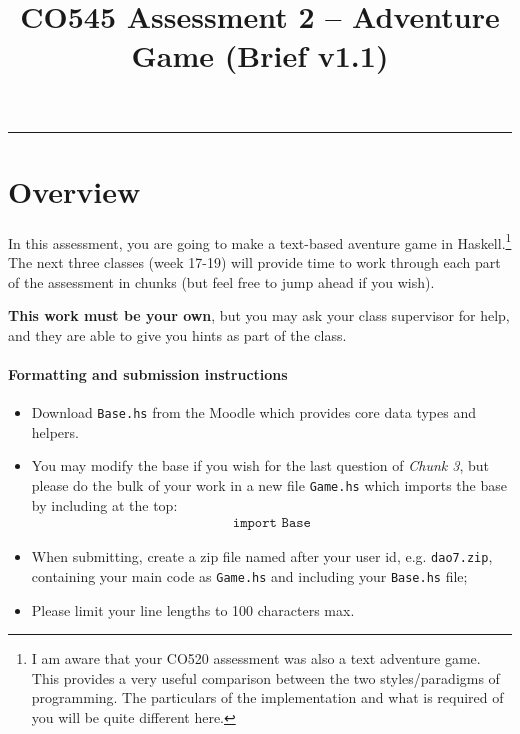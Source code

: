 \documentclass{article}
\date{}
\title{\vspace{-5em}CO545 Assessment 2 -- Adventure Game
{\footnotesize{(Brief v1.1)}}}
\begin{document}
\maketitle
\vspace{-5em}
\hrule
\vspace{1em}

\section{Overview}

In this assessment, you are going to make a text-based aventure game
in Haskell.\footnote{I am aware that your CO520 assessment was also a
  text adventure game. This provides a very useful comparison between
  the two styles/paradigms of programming. The particulars of the
  implementation and what is required of you will be quite different
  here. } The next three classes (week 17-19) will provide time
to work through each part of the assessment in chunks (but feel free
to jump ahead if you wish).

\textbf{This work must be your own}, but you may ask your class supervisor
for help, and they are able to give you hints as part of the class.

\paragraph{Formatting and submission instructions}
%
\begin{itemize}[itemsep=0.1em]
\item Download \texttt{Base.hs} from the Moodle which provides core
  data types and helpers.

\item You may modify the base if you wish for the last question of
  \textit{Chunk 3}, but please do the bulk of your work in a new file
  \texttt{Game.hs} which imports the base by including at the top:
%
\begin{align*}
\texttt{import Base}
\end{align*}
%

\item When submitting, create a zip file named after your user id,
  e.g. \texttt{dao7.zip}, containing your main code as
  \texttt{Game.hs} and including your \texttt{Base.hs} file;

\item Please limit your line lengths to 100 characters max.
\end{itemize}
%
\end{document}
